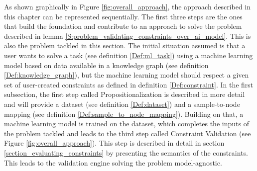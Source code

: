 
    As shown graphically in Figure \ref{fig:overall_approach}, the approach described in this chapter can be represented sequentially. The first three steps are the ones that build the foundation and contribute to an approach to solve the problem described in lemma \ref{S:problem_validating_constraints_over_ai_model}. This is also the problem tackled in this section. The initial situation assumed is that a user wants to solve a task (see definition \ref{Def:ml_task}) using a machine learning model based on data available in a knowledge graph (see definition \ref{Def:knowledge_graph}), but the machine learning model should respect a given set of user-created constraints as defined in definition \ref{Def:constraint}. In the first subsection, the first step called \glqq Propositionalization\grqq{} is described in more detail and will provide a dataset (see definition \ref{Def:dataset}) and a sample-to-node mapping (see definition \ref{Def:sample_to_node_mapping}). Building on that, a machine learning model is trained on the dataset, which completes the inputs of the problem tackled and leads to the third step called \glqq Constraint Validation\grqq{} (see Figure \ref{fig:overall_approach}). This step is described in detail in section \ref{section_evaluating_constraints} by presenting the semantics of the constraints. This leads to the validation engine solving the problem model-agnostic.

